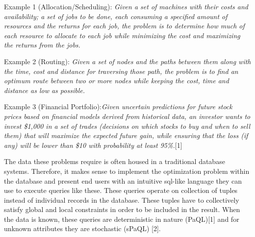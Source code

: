 \documentclass[a4paper,12pt]{article}
\begin{document}
{\small Example 1 (Allocation/Scheduling): \textit{Given a set of machines with their costs and availability; a set of jobs to be done, each consuming a specified amount of resources and the returns for each job, the problem is to determine how much of each resource to allocate to each job while minimizing the cost and maximizing the returns from the jobs.}\par}
\vspace{5mm}
{\small Example 2 (Routing): \textit{Given a set of nodes and the paths between them along with the time, cost and distance for traversing those path, the problem is to find an optimum route between two or more nodes while keeping the cost, time and distance as low as possible.}\par}
\vspace{5mm}

{\small Example 3 (Financial Portfolio):\textit{Given uncertain predictions for future stock prices based on financial models derived from historical data, an investor wants to invest \$1,000 in a set of trades (decisions on which stocks to buy and when to sell them) that will maximize the expected future gain, while ensuring that the loss (if any) will be lower than \$10 with probability at least 95\%.}[1]\par}
\vspace{5mm}

The data these problems require is often housed in a traditional database systems. Therefore, it makes sense to implement the optimization problem within the database and present end users with an intuitive sql-like language they can use to execute queries like these. These queries operate on collection of tuples instead of individual records in the database. These tuples have to collectively satisfy global and local constraints in order to be included in the result. When the data is known, these queries are deterministic in nature (PaQL)[1] and for unknown attributes they are stochastic (sPaQL) [2].
\\
\end{document}
